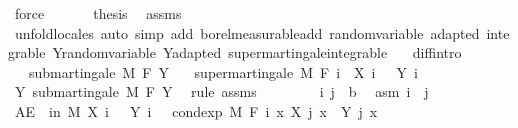 \begin{isabellebody}
\ force\isanewline
\ \ \isacommand{{\isacharbraceright}{\kern0pt}}\isamarkupfalse%
\isanewline
\ \ \isamarkupfalse%
\ {\isacharquery}{\kern0pt}thesis\ \isamarkupfalse%
\ assms\ \isamarkupfalse%
\ {\isacharparenleft}{\kern0pt}unfold{\isacharunderscore}{\kern0pt}locales{\isacharparenright}{\kern0pt}\ {\isacharparenleft}{\kern0pt}auto\ simp\ add{\isacharcolon}{\kern0pt}\ borel{\isacharunderscore}{\kern0pt}measurable{\isacharunderscore}{\kern0pt}add\ random{\isacharunderscore}{\kern0pt}variable\ adapted\ integrable\ Y{\isachardot}{\kern0pt}random{\isacharunderscore}{\kern0pt}variable\ Y{\isachardot}{\kern0pt}adapted\ supermartingale{\isachardot}{\kern0pt}integrable{\isacharparenright}{\kern0pt}\ \ \isanewline
{}\isamarkupfalse%
%
\endisatagproof
{\isafoldproof}%
%
\isadelimproof
\isanewline
%
\endisadelimproof
\isanewline
{}\isamarkupfalse%
\ diff{\isacharbrackleft}{\kern0pt}intro{\isacharbrackright}{\kern0pt}{\isacharcolon}{\kern0pt}\isanewline
\ \ \ {\isachardoublequoteopen}submartingale\ M\ F\ Y{\isachardoublequoteclose}\isanewline
\ \ \ {\isachardoublequoteopen}supermartingale\ M\ F\ {\isacharparenleft}{\kern0pt}{\isasymlambda}i\ {\isasymxi}{\isachardot}{\kern0pt}\ X\ i\ {\isasymxi}\ {\isacharminus}{\kern0pt}\ Y\ i\ {\isasymxi}{\isacharparenright}{\kern0pt}{\isachardoublequoteclose}\isanewline
%
\isadelimproof
%
\endisadelimproof
%
\isatagproof
{}\isamarkupfalse%
\ {\isacharminus}{\kern0pt}\isanewline
\ \ \isamarkupfalse%
\ Y{\isacharcolon}{\kern0pt}\ submartingale\ M\ F\ Y\ \isamarkupfalse%
\ {\isacharparenleft}{\kern0pt}rule\ assms{\isacharparenright}{\kern0pt}\isanewline
\ \ \isacommand{{\isacharbraceleft}{\kern0pt}}\isamarkupfalse%
\isanewline
\ \ \ \ \isamarkupfalse%
\ i\ j\ {\isacharcolon}{\kern0pt}{\isacharcolon}{\kern0pt}\ {\isacharprime}{\kern0pt}b\ \isamarkupfalse%
\ asm{\isacharcolon}{\kern0pt}\ {\isachardoublequoteopen}i\ {\isasymle}\ j{\isachardoublequoteclose}\isanewline
\ \ \ \ \isamarkupfalse%
\ {\isachardoublequoteopen}AE\ {\isasymxi}\ in\ M{\isachardot}{\kern0pt}\ X\ i\ {\isasymxi}\ {\isacharminus}{\kern0pt}\ Y\ i\ {\isasymxi}\ {\isasymge}\ cond{\isacharunderscore}{\kern0pt}exp\ M\ {\isacharparenleft}{\kern0pt}F\ i{\isacharparenright}{\kern0pt}\ {\isacharparenleft}{\kern0pt}{\isasymlambda}x{\isachardot}{\kern0pt}\ X\ j\ x\ {\isacharminus}{\kern0pt}\ Y\ j\ x{\isacharparenright}{\kern0pt}\ {\isasymxi}{\isachardoublequoteclose}\ \isanewline

\end{isabellebody}
